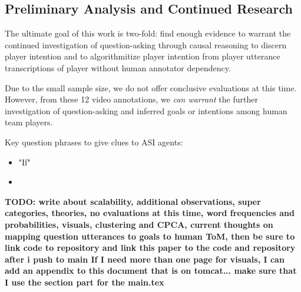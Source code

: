 \documentclass[10pt]{article}
\begin{document}
\subsection{Preliminary Analysis and Continued Research}
The ultimate goal of this work is two-fold: find enough evidence to warrant the continued investigation of question-asking through causal reasoning to discern player intention and to algorithmitize player intention from player utterance transcriptions of player without human annotator dependency. 

Due to the small sample size, we do not offer conclusive evaluations at this time. However, from these 12 video annotations, we \emph{can warrant} the further investigation of question-asking and inferred goals or intentions among human team players.

Key question phrases to give clues to ASI agents:
\begin{itemize}
    \item "If"
    \item
\end{itemize}



\textbf{TODO: write about scalability, additional observations, super categories, theories, no evaluations at this time, word frequencies and probabilities, visuals, clustering and CPCA, current thoughts on mapping question utterances to goals to human ToM, then be sure to link code to repository and link this paper to the code and repository after i push to main If I need more than one page for visuals, I can add an appendix to this document that is on tomcat... make sure that I use the section part for the main.tex}




\newpage

\raggedright
\end{document}
